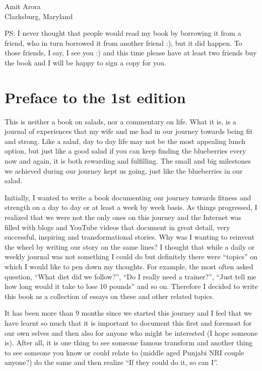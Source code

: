 \documentclass[
  oneside]{book}
\begin{document}
Amit Arora\\
Clarksburg, Maryland

PS: I never thought that people would read my book by borrowing it from a friend, who in turn borrowed it from another friend :), but it did happen. To those friends, I say, I see you :) and this time please have at least two friends buy the book and I will be happy to sign a copy for you.

\hypertarget{preface-to-the-1st-edition}{%
\chapter{Preface to the 1st edition}\label{preface-to-the-1st-edition}}

This is neither a book on salads, nor a commentary on life. What it is, is a journal of experiences that my wife and me had in our journey towards being fit and strong. Like a salad, day to day life may not be the most appealing lunch option, but just like a good salad if you can keep finding the blueberries every now and again, it is both rewarding and fulfilling. The small and big milestones we achieved during our journey kept us going, just like the blueberries in our salad.

Initially, I wanted to write a book documenting our journey towards fitness and strength on a day to day or at least a week by week basis. As things progressed, I realized that we were not the only ones on this journey and the Internet was filled with blogs and YouTube videos that document in great detail, very successful, inspiring and transformational stories. Why was I wanting to reinvent the wheel by writing our story on the same lines? I thought that while a daily or weekly journal was not something I could do but definitely there were ``topics'' on which I would like to pen down my thoughts. For example, the most often asked question, ``What diet did we follow?'', ``Do I really need a trainer?'', ``Just tell me how long would it take to lose 10 pounds'' and so on. Therefore I decided to write this book as a collection of essays on these and other related topics.

It has been more than 9 months since we started this journey and I feel that we have learnt so much that it is important to document this first and foremost for our own selves and then also for anyone who might be interested (I hope someone is). After all, it is one thing to see someone famous transform and another thing to see someone you know or could relate to (middle aged Punjabi NRI couple anyone?) do the same and then realize ``If they could do it, so can I''.
\end{document}
